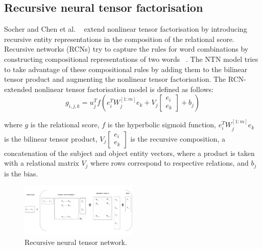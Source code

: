 \subsection{Recursive neural tensor factorisation}

Socher and Chen et al.  \unskip ~\citep{socher2013reasoning} extend nonlinear tensor factorisation by introducing recursive entity representations in the composition of the relational score. Recursive networks (RCNs) try to capture the rules for word combinations by constructing compositional representations of two words \unskip ~\citep{socher2012semantic}. The NTN model tries to take advantage of these compositional rules by adding them to the bilinear tensor product and augmenting the nonlinear tensor factorisation. The RCN-extended nonlinear tensor factorisation model is defined as follows:
\begin{equation}
	g_{i,j,k} =  u_j^Tf(e_i^TW_j^{\left [1:m \right ]} e_k + V_j \left [ \begin{matrix} e_i \\ e_k \end{matrix} \right ] + b_j)
\end{equation}

\noindent where $g$ is the relational score, $f$ is the hyperbolic sigmoid function, $e_i^TW_j^{\left [1:m \right ]} e_k $ is the bilinear tensor product, $V_j \left [ \begin{matrix} e_i \\ e_k \end{matrix} \right ]$ is the recursive composition, a concatenation of the subject and object entity vectors, where a product is taken with a relational matrix $ V_j $ where rows correspond to respective relations, and $ b_j $ is the bias. \par

\begin{figure}[H]
   	\centering
    	\includegraphics[width=0.5\textwidth, height=0.3\textwidth]{recursive_neural_tensor_network.png}
	\caption{Recursive neural tensor network.}
\end{figure}

